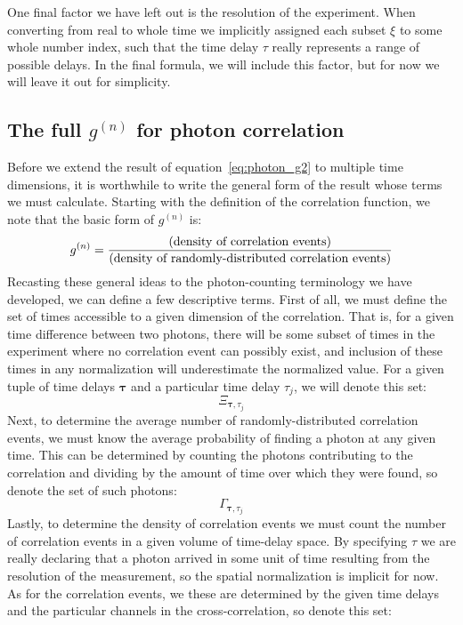 \documentclass{article}
\newcommand{\parens}[1]{\ensuremath{\left( #1 \right)}}
\newcommand{\gn}[1]{\ensuremath{g^{(#1)}}}
\renewcommand{\vec}{\boldsymbol}
\newcommand{\photons}{\ensuremath{\Gamma}}
\newcommand{\integrationtime}{\ensuremath{\Xi}}
\newcommand{\timewindow}{\ensuremath{\xi}}
\begin{document}
One final factor we have left out is the resolution of the experiment. When converting from real to whole time we implicitly assigned each subset $\timewindow$ to some whole number index, such that the time delay $\tau$ really represents a range of possible delays. In the final formula, we will include this factor, but for now we will leave it out for simplicity.

\subsection{The full \gn{n} for photon correlation}
Before we extend the result of equation~\ref{eq:photon_g2} to multiple time dimensions, it is worthwhile to write the general form of the result whose terms we must calculate. Starting with the definition of the correlation function, we note that the basic form of \gn{n} is:
\begin{equation}
\gn{n} = \frac{\parens{\textnormal{density of correlation events}}}
              {\parens{\textnormal{density of randomly-distributed correlation events}}}
\end{equation}
Recasting these general ideas to the photon-counting terminology we have developed, we can define a few descriptive terms. First of all, we must define the set of times accessible to a given dimension of the correlation. That is, for a given time difference between two photons, there will be some subset of times in the experiment where no correlation event can possibly exist, and inclusion of these times in any normalization will underestimate the normalized value. For a given tuple of time delays $\vec{\tau}$ and a particular time delay $\tau_{j}$, we will denote this set:
\begin{equation}
\integrationtime_{\vec{\tau},\tau_{j}}
\end{equation}
Next, to determine the average number of randomly-distributed correlation events, we must know the average probability of finding a photon at any given time. This can be determined by counting the photons contributing to the correlation and dividing by the amount of time over which they were found, so denote the set of such photons:
\begin{equation}
\photons_{\vec{\tau},\tau_{j}}
\end{equation}
Lastly, to determine the density of correlation events we must count the number of correlation events in a given volume of time-delay space. By specifying $\tau$ we are really declaring that a photon arrived in some unit of time resulting from the resolution of the measurement, so the spatial normalization is implicit for now. As for the correlation events, we these are determined by the given time delays and the particular channels in the cross-correlation, so denote this set:
\end{document}
